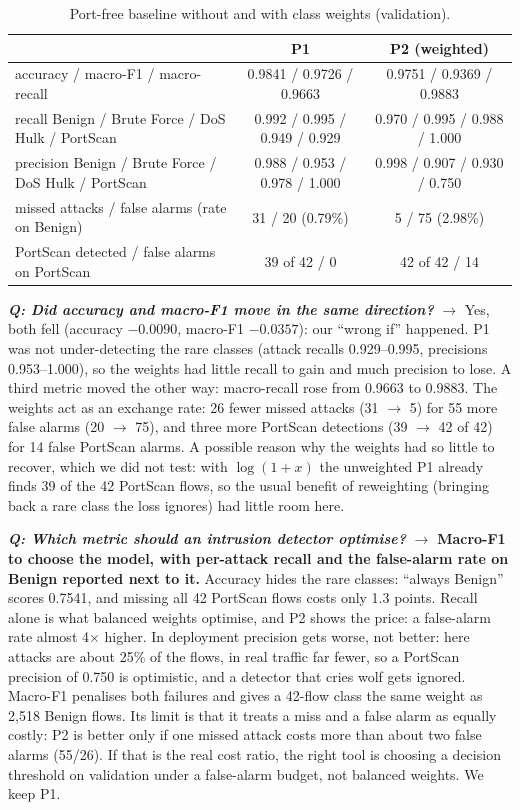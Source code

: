\documentclass[9pt]{extarticle}
\newcommand{\Q}[1]{\textbf{\emph{Q: #1}}}
\newcommand{\run}[1]{\textsf{#1}}
\begin{document}
\begin{table}[h]
\centering\small
\begin{tabular}{lcc}
\toprule
 & \run{P1} & \run{P2} (weighted) \\
\midrule
accuracy / macro-F1 / macro-recall & 0.9841 / 0.9726 / 0.9663 & 0.9751 / 0.9369 / 0.9883 \\
recall Benign / Brute Force / DoS Hulk / PortScan & 0.992 / 0.995 / 0.949 / 0.929 & 0.970 / 0.995 / 0.988 / 1.000 \\
precision Benign / Brute Force / DoS Hulk / PortScan & 0.988 / 0.953 / 0.978 / 1.000 & 0.998 / 0.907 / 0.930 / 0.750 \\
missed attacks / false alarms (rate on Benign) & 31 / 20 (0.79\%) & 5 / 75 (2.98\%) \\
PortScan detected / false alarms on PortScan & 39 of 42 / 0 & 42 of 42 / 14 \\
\bottomrule
\end{tabular}
\caption{Port-free baseline without and with class weights (validation).}
\label{tab:p}
\end{table}

\Q{Did accuracy and macro-F1 move in the same direction?} $\rightarrow$ Yes, both fell (accuracy $-0.0090$, macro-F1 $-0.0357$): our ``wrong if'' happened. \run{P1} was not under-detecting the rare classes (attack recalls 0.929--0.995, precisions 0.953--1.000), so the weights had little recall to gain and much precision to lose. A third metric moved the other way: macro-recall rose from 0.9663 to 0.9883. The weights act as an exchange rate: 26 fewer missed attacks (31 $\rightarrow$ 5) for 55 more false alarms (20 $\rightarrow$ 75), and three more PortScan detections (39 $\rightarrow$ 42 of 42) for 14 false PortScan alarms. A possible reason why the weights had so little to recover, which we did not test: with $\log(1+x)$ the unweighted \run{P1} already finds 39 of the 42 PortScan flows, so the usual benefit of reweighting (bringing back a rare class the loss ignores) had little room here.

\Q{Which metric should an intrusion detector optimise?} $\rightarrow$ \textbf{Macro-F1 to choose the model, with per-attack recall and the false-alarm rate on Benign reported next to it.} Accuracy hides the rare classes: ``always Benign'' scores 0.7541, and missing all 42 PortScan flows costs only 1.3 points. Recall alone is what balanced weights optimise, and \run{P2} shows the price: a false-alarm rate almost 4$\times$ higher. In deployment precision gets worse, not better: here attacks are about 25\% of the flows, in real traffic far fewer, so a PortScan precision of 0.750 is optimistic, and a detector that cries wolf gets ignored. Macro-F1 penalises both failures and gives a 42-flow class the same weight as 2,518 Benign flows. Its limit is that it treats a miss and a false alarm as equally costly: \run{P2} is better only if one missed attack costs more than about two false alarms (55/26). If that is the real cost ratio, the right tool is choosing a decision threshold on validation under a false-alarm budget, not balanced weights. We keep \run{P1}.
\end{document}
